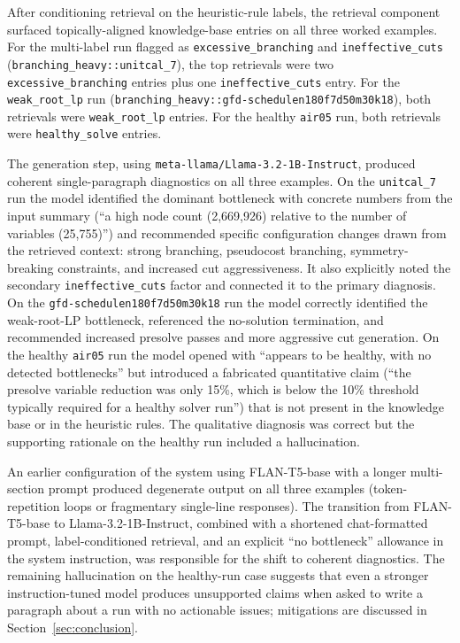 \documentclass[11pt]{article}
\begin{document}
After conditioning retrieval on the heuristic-rule labels, the retrieval component surfaced topically-aligned knowledge-base entries on all three worked examples. For the multi-label run flagged as \texttt{excessive\_branching} and \texttt{ineffective\_cuts} (\texttt{branching\_heavy::unitcal\_7}), the top retrievals were two \texttt{excessive\_branching} entries plus one \texttt{ineffective\_cuts} entry. For the \texttt{weak\_root\_lp} run (\texttt{branching\_heavy::gfd-schedulen180f7d50m30k18}), both retrievals were \texttt{weak\_root\_lp} entries. For the healthy \texttt{air05} run, both retrievals were \texttt{healthy\_solve} entries.

The generation step, using \texttt{meta-llama/Llama-3.2-1B-Instruct}, produced coherent single-paragraph diagnostics on all three examples. On the \texttt{unitcal\_7} run the model identified the dominant bottleneck with concrete numbers from the input summary (``a high node count (2,669,926) relative to the number of variables (25,755)'') and recommended specific configuration changes drawn from the retrieved context: strong branching, pseudocost branching, symmetry-breaking constraints, and increased cut aggressiveness. It also explicitly noted the secondary \texttt{ineffective\_cuts} factor and connected it to the primary diagnosis. On the \texttt{gfd-schedulen180f7d50m30k18} run the model correctly identified the weak-root-LP bottleneck, referenced the no-solution termination, and recommended increased presolve passes and more aggressive cut generation. On the healthy \texttt{air05} run the model opened with ``appears to be healthy, with no detected bottlenecks'' but introduced a fabricated quantitative claim (``the presolve variable reduction was only 15\%, which is below the 10\% threshold typically required for a healthy solver run'') that is not present in the knowledge base or in the heuristic rules. The qualitative diagnosis was correct but the supporting rationale on the healthy run included a hallucination.

An earlier configuration of the system using FLAN-T5-base with a longer multi-section prompt produced degenerate output on all three examples (token-repetition loops or fragmentary single-line responses). The transition from FLAN-T5-base to Llama-3.2-1B-Instruct, combined with a shortened chat-formatted prompt, label-conditioned retrieval, and an explicit ``no bottleneck'' allowance in the system instruction, was responsible for the shift to coherent diagnostics. The remaining hallucination on the healthy-run case suggests that even a stronger instruction-tuned model produces unsupported claims when asked to write a paragraph about a run with no actionable issues; mitigations are discussed in Section~\ref{sec:conclusion}.
\end{document}
